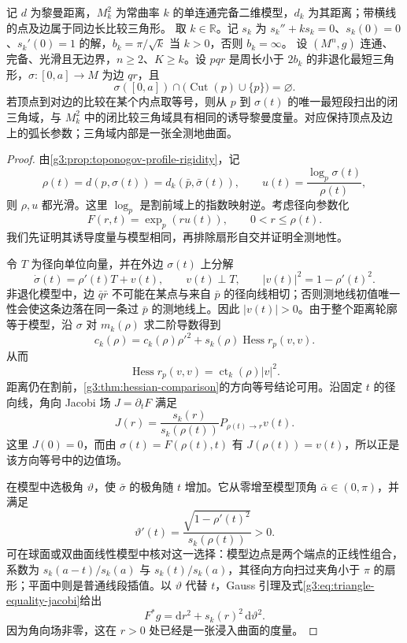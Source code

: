 \begin{proposition}\label{g3:prop:toponogov-fan-rigidity}
	记 \(d\) 为黎曼距离，\(M_k^2\) 为常曲率 \(k\) 的单连通完备二维模型，\(d_k\) 为其距离；带横线的点及边属于同边长比较三角形。
	取 \(k\in\mathbb R\)。记 \(s_k\) 为 \(s_k''+ks_k=0\)、\(s_k(0)=0\)、\(s_k'(0)=1\) 的解，\(b_k=\pi/\sqrt k\) 当 \(k>0\)，否则 \(b_k=\infty\)。
 设 \((M^n,g)\) 连通、完备、光滑且无边界，\(n\ge2\)、\(K\ge k\)。设 \(pqr\) 是周长小于 \(2b_k\) 的非退化最短三角形，\(\sigma:[0,a]\to M\) 为边 \(qr\)，且
 \[
 \sigma([0,a])\cap\bigl(\operatorname{Cut}(p)\cup\{p\}\bigr)=\varnothing.
 \]
 若顶点到对边的比较在某个内点取等号，则从 \(p\) 到 \(\sigma(t)\) 的唯一最短段扫出的闭三角域，与 \(M_k^2\) 中的闭比较三角域具有相同的诱导黎曼度量。对应保持顶点及边上的弧长参数；三角域内部是一张全测地曲面。
\end{proposition}
\begin{proof}
 由\cref{g3:prop:toponogov-profile-rigidity}，记
 \[
 \rho(t)=d(p,\sigma(t))=d_k(\bar p,\bar\sigma(t)),\qquad
 u(t)=\frac{\log_p\sigma(t)}{\rho(t)},
 \]
 则 \(\rho,u\) 都光滑。这里 \(\log_p\) 是割前域上的指数映射逆。考虑径向参数化
 \[
 F(r,t)=\exp_p(ru(t)),\qquad 0<r\le\rho(t).
 \]
 我们先证明其诱导度量与模型相同，再排除扇形自交并证明全测地性。

 令 \(T\) 为径向单位向量，并在外边 \(\sigma(t)\) 上分解
 \[
 \dot\sigma(t)=\rho'(t)T+v(t),\qquad v(t)\perp T,
 \qquad |v(t)|^2=1-\rho'(t)^2.
 \]
 非退化模型中，边 \(\bar q\bar r\) 不可能在某点与来自 \(\bar p\) 的径向线相切；否则测地线初值唯一性会使这条边落在同一条过 \(\bar p\) 的测地线上。因此 \(|v(t)|>0\)。由于整个距离轮廓等于模型，沿 \(\sigma\) 对 \(m_k(\rho)\) 求二阶导数得到
 \[
 c_k(\rho)
 =c_k(\rho)\rho'^2+s_k(\rho)
       \operatorname{Hess}r_p(v,v).
 \]
 从而
 \[
 \operatorname{Hess}r_p(v,v)=\operatorname{ct}_k(\rho)|v|^2.
 \]
 距离仍在割前，\cref{g3:thm:hessian-comparison}的方向等号结论可用。沿固定 \(t\) 的径向线，角向 Jacobi 场 \(J=\partial_tF\) 满足
 \begin{equation}\label{g3:eq:triangle-equality-jacobi}
 J(r)=\frac{s_k(r)}{s_k(\rho(t))}P_{\rho(t)\to r}v(t).
 \end{equation}
 这里 \(J(0)=0\)，而由 \(\sigma(t)=F(\rho(t),t)\) 有 \(J(\rho(t))=v(t)\)，所以正是该方向等号中的边值场。

 在模型中选极角 \(\vartheta\)，使 \(\bar\sigma\) 的极角随 \(t\) 增加。它从零增至模型顶角 \(\bar\alpha\in(0,\pi)\)，并满足
 \[
 \vartheta'(t)=\frac{\sqrt{1-\rho'(t)^2}}{s_k(\rho(t))}>0.
 \]
 可在球面或双曲面线性模型中核对这一选择：模型边点是两个端点的正线性组合，系数为
 \(s_k(a-t)/s_k(a)\) 与 \(s_k(t)/s_k(a)\)，其径向方向扫过夹角小于 \(\pi\) 的扇形；平面中则是普通线段插值。以 \(\vartheta\) 代替 \(t\)，Gauss 引理及式\eqref{g3:eq:triangle-equality-jacobi}给出
 \begin{equation}\label{g3:eq:triangle-equality-polar-metric}
 F^*g=\mathrm dr^2+s_k(r)^2\,\mathrm d\vartheta^2.
 \end{equation}
 因为角向场非零，这在 \(r>0\) 处已经是一张浸入曲面的度量。


\end{proof}
